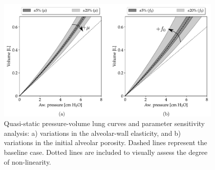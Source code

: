 \documentclass[preprint,3p,12pt,number,sort&compress]{elsarticle}
\begin{document}
\begin{figure}[h!]
    \begin{center}
    \includegraphics[width=1 \textwidth]{./Figures/SA_super.pdf}
    \caption[]{Quasi-static pressure-volume lung curves and parameter sensitivity analysis: a) variations in the alveolar-wall elasticity, and b) variations in the initial alveolar porosity. Dashed lines represent the baseline case. Dotted lines are included to visually assess the degree of non-linearity.}
    \label{fig:PV-curves}
    \end{center}
\end{figure}
\end{document}
